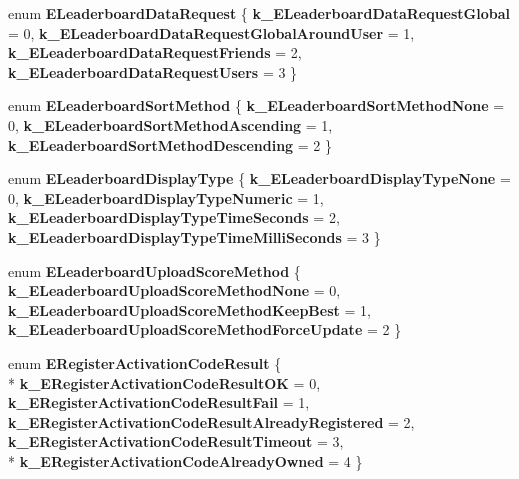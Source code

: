 \begin{DoxyCompactItemize}
\item 
\hypertarget{namespaceValve_1_1Steamworks_a5a582107e70537c761a1e95746e62759}{}enum {\bfseries E\+Leaderboard\+Data\+Request} \{ {\bfseries k\+\_\+\+E\+Leaderboard\+Data\+Request\+Global} = 0, 
{\bfseries k\+\_\+\+E\+Leaderboard\+Data\+Request\+Global\+Around\+User} = 1, 
{\bfseries k\+\_\+\+E\+Leaderboard\+Data\+Request\+Friends} = 2, 
{\bfseries k\+\_\+\+E\+Leaderboard\+Data\+Request\+Users} = 3
 \}\label{namespaceValve_1_1Steamworks_a5a582107e70537c761a1e95746e62759}

\item 
\hypertarget{namespaceValve_1_1Steamworks_a5ce15f7c19ca21b76efd07e54d234153}{}enum {\bfseries E\+Leaderboard\+Sort\+Method} \{ {\bfseries k\+\_\+\+E\+Leaderboard\+Sort\+Method\+None} = 0, 
{\bfseries k\+\_\+\+E\+Leaderboard\+Sort\+Method\+Ascending} = 1, 
{\bfseries k\+\_\+\+E\+Leaderboard\+Sort\+Method\+Descending} = 2
 \}\label{namespaceValve_1_1Steamworks_a5ce15f7c19ca21b76efd07e54d234153}

\item 
\hypertarget{namespaceValve_1_1Steamworks_a32c8fd32150d5c70cdc99976acbf8a62}{}enum {\bfseries E\+Leaderboard\+Display\+Type} \{ {\bfseries k\+\_\+\+E\+Leaderboard\+Display\+Type\+None} = 0, 
{\bfseries k\+\_\+\+E\+Leaderboard\+Display\+Type\+Numeric} = 1, 
{\bfseries k\+\_\+\+E\+Leaderboard\+Display\+Type\+Time\+Seconds} = 2, 
{\bfseries k\+\_\+\+E\+Leaderboard\+Display\+Type\+Time\+Milli\+Seconds} = 3
 \}\label{namespaceValve_1_1Steamworks_a32c8fd32150d5c70cdc99976acbf8a62}

\item 
\hypertarget{namespaceValve_1_1Steamworks_a6a2b9d374dbd2806430d5ed16e5731a2}{}enum {\bfseries E\+Leaderboard\+Upload\+Score\+Method} \{ {\bfseries k\+\_\+\+E\+Leaderboard\+Upload\+Score\+Method\+None} = 0, 
{\bfseries k\+\_\+\+E\+Leaderboard\+Upload\+Score\+Method\+Keep\+Best} = 1, 
{\bfseries k\+\_\+\+E\+Leaderboard\+Upload\+Score\+Method\+Force\+Update} = 2
 \}\label{namespaceValve_1_1Steamworks_a6a2b9d374dbd2806430d5ed16e5731a2}

\item 
\hypertarget{namespaceValve_1_1Steamworks_a8ffac8f17933f61d4e965d07681500f8}{}enum {\bfseries E\+Register\+Activation\+Code\+Result} \{ \\*
{\bfseries k\+\_\+\+E\+Register\+Activation\+Code\+Result\+O\+K} = 0, 
{\bfseries k\+\_\+\+E\+Register\+Activation\+Code\+Result\+Fail} = 1, 
{\bfseries k\+\_\+\+E\+Register\+Activation\+Code\+Result\+Already\+Registered} = 2, 
{\bfseries k\+\_\+\+E\+Register\+Activation\+Code\+Result\+Timeout} = 3, 
\\*
{\bfseries k\+\_\+\+E\+Register\+Activation\+Code\+Already\+Owned} = 4
 \}\label{namespaceValve_1_1Steamworks_a8ffac8f17933f61d4e965d07681500f8}


\end{DoxyCompactItemize}
